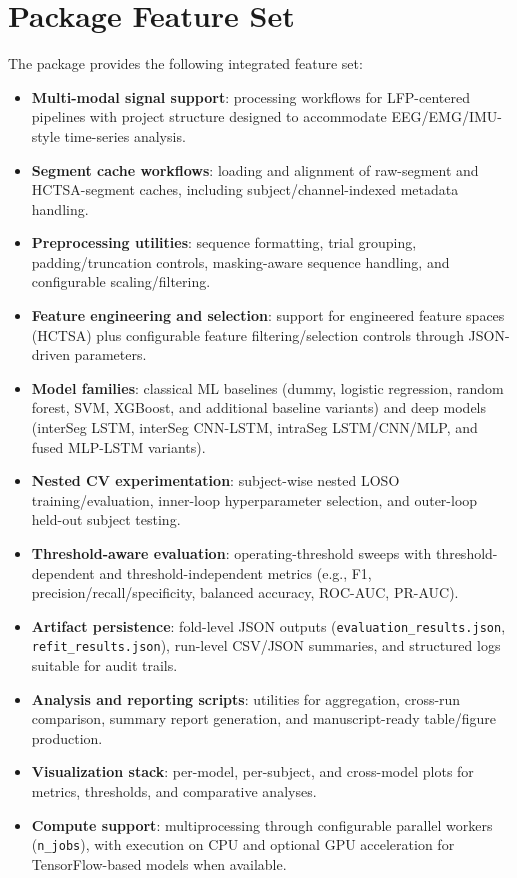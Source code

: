 \section{Package Feature Set}
\label{sec:reproducibility_package_features}
The package provides the following integrated feature set:
\begin{itemize}
\item \textbf{Multi-modal signal support}: processing workflows for LFP-centered pipelines with project structure designed to accommodate EEG/EMG/IMU-style time-series analysis.
\item \textbf{Segment cache workflows}: loading and alignment of raw-segment and HCTSA-segment caches, including subject/channel-indexed metadata handling.
\item \textbf{Preprocessing utilities}: sequence formatting, trial grouping, padding/truncation controls, masking-aware sequence handling, and configurable scaling/filtering.
\item \textbf{Feature engineering and selection}: support for engineered feature spaces (HCTSA) plus configurable feature filtering/selection controls through JSON-driven parameters.
\item \textbf{Model families}: classical ML baselines (dummy, logistic regression, random forest, SVM, XGBoost, and additional baseline variants) and deep models (interSeg LSTM, interSeg CNN-LSTM, intraSeg LSTM/CNN/MLP, and fused MLP-LSTM variants).
\item \textbf{Nested CV experimentation}: subject-wise nested LOSO training/evaluation, inner-loop hyperparameter selection, and outer-loop held-out subject testing.
\item \textbf{Threshold-aware evaluation}: operating-threshold sweeps with threshold-dependent and threshold-independent metrics (e.g., F1, precision/recall/specificity, balanced accuracy, ROC-AUC, PR-AUC).
\item \textbf{Artifact persistence}: fold-level JSON outputs (\texttt{evaluation\_results.json}, \texttt{refit\_results.json}), run-level CSV/JSON summaries, and structured logs suitable for audit trails.
\item \textbf{Analysis and reporting scripts}: utilities for aggregation, cross-run comparison, summary report generation, and manuscript-ready table/figure production.
\item \textbf{Visualization stack}: per-model, per-subject, and cross-model plots for metrics, thresholds, and comparative analyses.
\item \textbf{Compute support}: multiprocessing through configurable parallel workers (\texttt{n\_jobs}), with execution on CPU and optional GPU acceleration for TensorFlow-based models when available.

\end{itemize}
